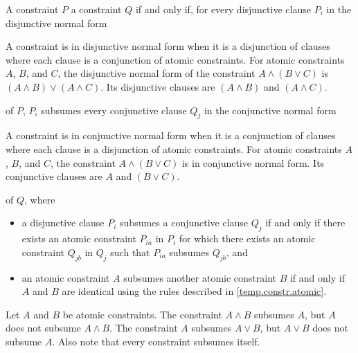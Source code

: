 \documentclass{wg21}
\begin{document}
\pnum
A constraint $P$  a constraint $Q$
if and only if,
for every disjunctive clause $P_i$
in the disjunctive normal form
\begin{wfootnote}
    A constraint is in disjunctive normal form when it is a disjunction of
    clauses where each clause is a conjunction of atomic constraints.
    For atomic constraints $A$, $B$, and $C$, the disjunctive normal form
    of the constraint
    $A \land (B \lor C)$
    is
    $(A \land B) \lor (A \land C)$.
    Its disjunctive clauses are $(A \land B)$ and $(A \land C)$.
\end{wfootnote}
of $P$, $P_i$ subsumes every conjunctive clause $Q_j$
in the conjunctive normal form
\begin{wfootnote}
    A constraint is in conjunctive normal form when it is a conjunction
    of clauses where each clause is a disjunction of atomic constraints.
    For atomic constraints $A$, $B$, and $C$, the constraint
    $A \land (B \lor C)$ is in conjunctive normal form.
    Its conjunctive clauses are $A$ and $(B \lor C)$.
\end{wfootnote}
of $Q$, where
\begin{itemize}
    \item
    a disjunctive clause $P_i$ subsumes a conjunctive clause $Q_j$ if and only
    if there exists an atomic constraint $P_{ia}$ in $P_i$ for which there exists
    an atomic constraint $Q_{jb}$ in $Q_j$ such that $P_{ia}$ subsumes $Q_{jb}$, and

    \item an atomic constraint $A$ subsumes another atomic constraint
    $B$ if and only if $A$ and $B$ are identical using the
    rules described in \ref{temp.constr.atomic}.



\end{itemize}
%
\begin{example}
    Let $A$ and $B$ be atomic constraints.
    The constraint $A \land B$ subsumes $A$, but $A$ does not subsume $A \land B$.
    The constraint $A$ subsumes $A \lor B$, but $A \lor B$ does not subsume $A$.
    Also note that every constraint subsumes itself.
\end{example}
\end{document}
